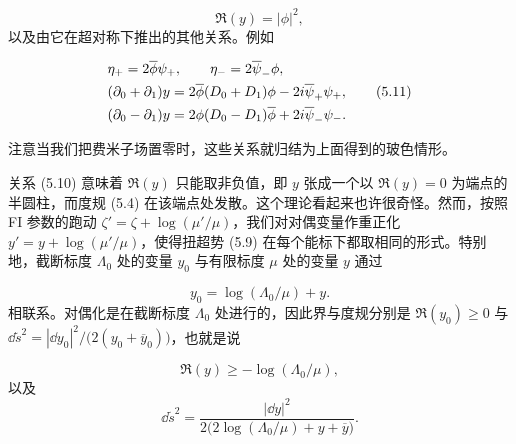 \begin{equation}
    \Re(y)=|\phi|^2,
    \tag{5.10}
\end{equation}
以及由它在超对称下推出的其他关系。例如

\begin{align}
    &\eta_+=2\overline{\phi}\psi_+,\qquad \eta_-=2\overline{\psi}_-\phi, \notag\\
    &(\partial_0+\partial_1)y=2\overline{\phi}(D_0+D_1)\phi-2i\overline{\psi}_+\psi_+, \tag{5.11}\\
    &(\partial_0-\partial_1)y=2\phi(D_0-D_1)\overline{\phi}+2i\overline{\psi}_-\psi_-. \notag
\end{align}

注意当我们把费米子场置零时，这些关系就归结为上面得到的玻色情形。

关系 (5.10) 意味着 $\Re(y)$ 只能取非负值，即 $y$ 张成一个以 $\Re(y)=0$ 为端点的半圆柱，而度规 (5.4) 在该端点处发散。这个理论看起来也许很奇怪。然而，按照 FI 参数的跑动 $\zeta'=\zeta+\log(\mu'/\mu)$，我们对对偶变量作重正化 $y'=y+\log(\mu'/\mu)$，使得扭超势 (5.9) 在每个能标下都取相同的形式。特别地，截断标度 $\Lambda_0$ 处的变量 $y_0$ 与有限标度 $\mu$ 处的变量 $y$ 通过

\begin{equation}
    y_0=\log(\Lambda_0/\mu)+y.
    \tag{5.12}
\end{equation}
相联系。对偶化是在截断标度 $\Lambda_0$ 处进行的，因此界与度规分别是 $\Re(y_0)\ge0$ 与 $\dd\tilde{s}^2=|\dd y_0|^2/\bigl(2(y_0+\overline{y}_0)\bigr)$，也就是说

\begin{equation}
    \Re(y)\ge-\log(\Lambda_0/\mu),
    \tag{5.13}
\end{equation}
以及
\begin{equation}
    \dd\tilde{s}^2=\frac{|\dd y|^2}{2\bigl(2\log(\Lambda_0/\mu)+y+\overline{y}\bigr)}.
    \tag{5.14}
\end{equation}

